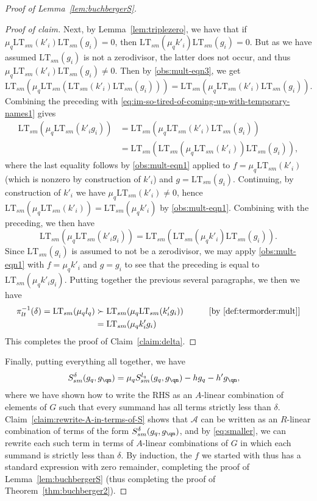 \documentclass[11pt,reqno]{amsart}
\newcommand*{\eqcomment}[2][\qquad]{#1 &&\text{[#2]}}
\newcommand{\ltsm}{\text{LT}_{sm}}
\newcommand{\Ssm}{S_{sm}}
\theoremstyle{definition}
\numberwithin{equation}{section}
\begin{document}
\begin{proof}[Proof of Lemma~\ref{lem:buchbergerS}]
\begin{proof}[Proof of claim]
Next, by Lemma~\ref{lem:triplezero}, we have that if $\mu_q \ltsm(k'_i) \ltsm(g_i) = 0$, then $\ltsm(\mu_q k'_i) \ltsm(g_i) = 0$. But as we have assumed $\ltsm(g_i)$ is not a zerodivisor, the latter does not occur, and thus $\mu_q \ltsm(k'_i) \ltsm(g_i) \neq 0$. Then by \eqref{obs:mult-eqn3}, we get
\[
\ltsm(\mu_q \ltsm(\ltsm(k'_i) \ltsm(g_i))) = \ltsm(\mu_q \ltsm(k'_i) \ltsm(g_i)).
\]
Combining the preceding with \eqref{eq:im-so-tired-of-coming-up-with-temporary-names1} gives
\begin{align*}
\ltsm(\mu_q \ltsm(k'_i g_i)) & = \ltsm(\mu_q \ltsm(k'_i) \ltsm(g_i)) \\
 & = \ltsm(\ltsm(\mu_q \ltsm(k'_i)) \ltsm(g_i)), 
\end{align*}
where the last equality follows by \eqref{obs:mult-eqn1} applied to $f=\mu_q \ltsm(k'_i)$ (which is nonzero by construction of $k'_i$) and $g = \ltsm(g_i)$. Continuing, by construction of $k'_i$ we have $\mu_q \ltsm(k'_i) \neq 0$, hence $\ltsm(\mu_q \ltsm(k'_i)) = \ltsm(\mu_q k'_i)$ by \eqref{obs:mult-eqn1}. Combining with the preceding, we then have
 \[
 \ltsm(\mu_q \ltsm(k'_i g_i)) = \ltsm(\ltsm(\mu_q k'_i) \ltsm(g_i)).
 \]
 Since $\ltsm(g_i)$ is assumed to not be a zerodivisor, we may apply \eqref{obs:mult-eqn1} with $f = \mu_q k'_i$ and $g = g_i$ to see that the preceding is equal to $\ltsm(\mu_q k'_i g_i)$. Putting together the previous several paragraphs, we then we have
\begin{align*}
\pi_{lt}^{-1}(\delta) = \ltsm(\mu_q l_q) & \succ \ltsm(\mu_q \ltsm(k'_i g_i)) \eqcomment{by \ref{def:termorder:mult}} \\
& = \ltsm(\mu_q k'_i g_i) 
\end{align*}
This completes the proof of Claim~\ref{claim:delta}. 
\end{proof}

Finally, putting everything all together, we have
\begin{align} \label{eq:smaller}
\Ssm^{\delta}(g_q,g_{\qn})  & = \mu_q \Ssm^{l_q}(g_q,g_{\qn}) - hg_q - h'g_{\qn}, 
\end{align}
where we have shown how to write the RHS as an $A$-linear combination of elements of $G$ such that every summand has all terms strictly less than $\delta$. Claim~\ref{claim:rewrite-A-in-terms-of-S} shows that $\mathcal{A}$ can be written as an $R$-linear combination of terms of the form $\Ssm^{\delta}(g_q, g_{\qn})$, and by \eqref{eq:smaller}, we can rewrite each such term in terms of $A$-linear combinations of $G$ in which each summand is strictly less than $\delta$. By induction, the $f$ we started with thus has a standard expression with zero remainder, completing the proof of Lemma~\ref{lem:buchbergerS} (thus completing the proof of Theorem~\ref{thm:buchberger2}).
\end{proof}
\end{document}
